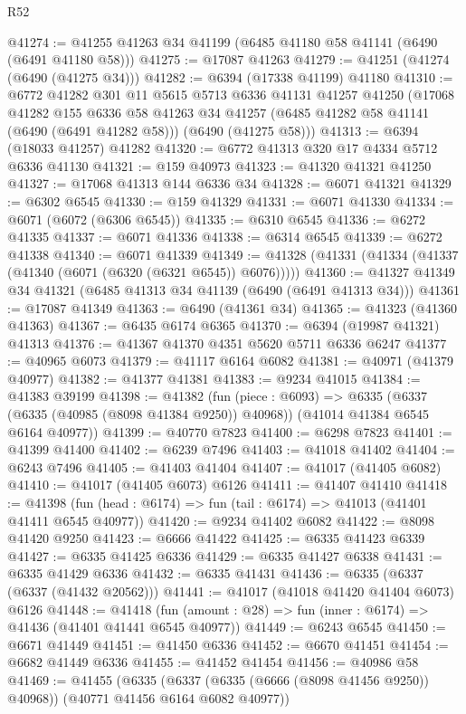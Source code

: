 \begin{lexlean}{R52}
\begin{coremodule}
@41274 := @41255 @41263 @34 @41199 (@6485 @41180 @58 @41141 (@6490 (@6491 @41180 @58)))
@41275 := @17087 @41263
@41279 := @41251 (@41274 (@6490 (@41275 @34)))
@41282 := @6394 (@17338 @41199) @41180
@41310 := @6772
    @41282
    @301
    @11
    @5615
    @5713
    @6336
    @41131
    @41257
    @41250
    (@17068
      @41282
      @155
      @6336
      @58
      @41263
      @34
      @41257
      (@6485 @41282 @58 @41141 (@6490 (@6491 @41282 @58)))
      (@6490 (@41275 @58)))
@41313 := @6394 (@18033 @41257) @41282
@41320 := @6772 @41313 @320 @17 @4334 @5712 @6336 @41130
@41321 := @159 @40973
@41323 := @41320 @41321 @41250
@41327 := @17068 @41313 @144 @6336 @34
@41328 := @6071 @41321
@41329 := @6302 @6545
@41330 := @159 @41329
@41331 := @6071 @41330
@41334 := @6071 (@6072 (@6306 @6545))
@41335 := @6310 @6545
@41336 := @6272 @41335
@41337 := @6071 @41336
@41338 := @6314 @6545
@41339 := @6272 @41338
@41340 := @6071 @41339
@41349 := @41328 (@41331 (@41334 (@41337 (@41340 (@6071 (@6320 (@6321 @6545)) @6076)))))
@41360 := @41327 @41349 @34 @41321 (@6485 @41313 @34 @41139 (@6490 (@6491 @41313 @34)))
@41361 := @17087 @41349
@41363 := @6490 (@41361 @34)
@41365 := @41323 (@41360 @41363)
@41367 := @6435 @6174 @6365
@41370 := @6394 (@19987 @41321) @41313
@41376 := @41367 @41370 @4351 @5620 @5711 @6336 @6247
@41377 := @40965 @6073
@41379 := @41117 @6164 @6082
@41381 := @40971 (@41379 @40977)
@41382 := @41377 @41381
@41383 := @9234 @41015
@41384 := @41383 @39199
@41398 := @41382
    (fun (piece : @6093) =>
    @6335 (@6337 (@6335 (@40985 (@8098 @41384 @9250)) @40968)) (@41014 @41384 @6545 @6164 @40977))
@41399 := @40770 @7823
@41400 := @6298 @7823
@41401 := @41399 @41400
@41402 := @6239 @7496
@41403 := @41018 @41402
@41404 := @6243 @7496
@41405 := @41403 @41404
@41407 := @41017 (@41405 @6082)
@41410 := @41017 (@41405 @6073) @6126
@41411 := @41407 @41410
@41418 := @41398 (fun (head : @6174) => fun (tail : @6174) => @41013 (@41401 @41411 @6545 @40977))
@41420 := @9234 @41402 @6082
@41422 := @8098 @41420 @9250
@41423 := @6666 @41422
@41425 := @6335 @41423 @6339
@41427 := @6335 @41425 @6336
@41429 := @6335 @41427 @6338
@41431 := @6335 @41429 @6336
@41432 := @6335 @41431
@41436 := @6335 (@6337 (@6337 (@41432 @20562)))
@41441 := @41017 (@41018 @41420 @41404 @6073) @6126
@41448 := @41418 (fun (amount : @28) => fun (inner : @6174) => @41436 (@41401 @41441 @6545 @40977))
@41449 := @6243 @6545
@41450 := @6671 @41449
@41451 := @41450 @6336
@41452 := @6670 @41451
@41454 := @6682 @41449 @6336
@41455 := @41452 @41454
@41456 := @40986 @58
@41469 := @41455
    (@6335 (@6337 (@6335 (@6666 (@8098 @41456 @9250)) @40968)) (@40771 @41456 @6164 @6082 @40977))

\end{coremodule}
\end{lexlean}
